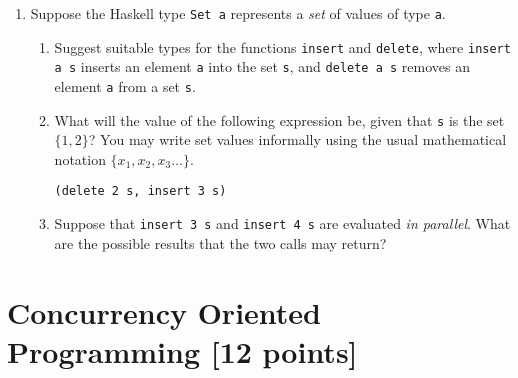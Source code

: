 \documentclass{article}
\begin{document}
\begin{enumerate}
\item
Suppose the Haskell type \verb!Set a! represents a {\em set} of values
of type \verb!a!.
\begin{enumerate}
\item
Suggest suitable types for the functions \verb!insert! and
\verb!delete!, where \verb!insert a s! inserts an element \verb!a!
into the set \verb!s!, and \verb!delete a s! removes an element
\verb!a! from a set \verb!s!.
\item
What will the value of the following expression be, given that
\verb!s! is the set $\{1,2\}$? You may write set values informally
using the usual mathematical notation $\{x_1, x_2, x_3\dots\}$.
\begin{verbatim}
(delete 2 s, insert 3 s)
\end{verbatim}
\item Suppose that \verb!insert 3 s! and \verb!insert 4 s! are evaluated {\em in parallel}. What are the possible results that the two calls may return?
\end{enumerate}



\end{enumerate}

\newpage
\section{Concurrency Oriented Programming [12 points]}
\end{document}
